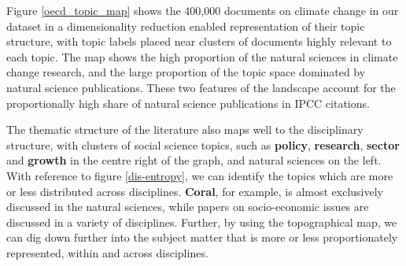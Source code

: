 \documentclass{article}
\begin{document}
\begin{linenumbers}
		Figure \ref{oecd_topic_map} shows the 400,000 documents on climate change in our dataset in a dimensionality reduction enabled representation of their topic structure, with topic labels placed near clusters of documents highly relevant to each topic. The map shows the high proportion of the natural sciences in climate change research, and the large proportion of the topic space dominated by natural science publications. These two features of the landscape account for the proportionally high share of natural science publications in IPCC citations.
		
		The thematic structure of the literature also maps well to the disciplinary structure, with clusters of social science topics, such as \textbf{policy}, \textbf{research}, \textbf{sector} and \textbf{growth} in the centre right of the graph, and natural sciences on the left. With reference to figure \ref{dis-entropy}, we can identify the topics which are more or less distributed across disciplines. \textbf{Coral}, for example, is almost exclusively discussed in the natural sciences, while papers on socio-economic issues are discussed in a variety of disciplines. Further, by using the topographical map, we can dig down further into the subject matter that is more or less proportionately represented, within and across disciplines.
		
		
		
		
		

\end{linenumbers}
\end{document}
